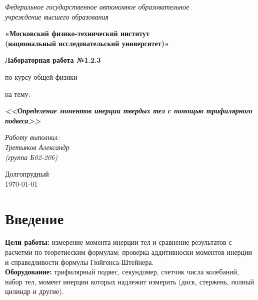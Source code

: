 




	
\begin{center}
	\textit{Федеральное государственное автономное образовательное\\ учреждение высшего образования }
	
	\vspace{0.5ex}
	
	\textbf{«Московский физико-технический институт\\ (национальный исследовательский университет)»}
\end{center}

\vspace{10ex}


\begin{center}
	\vspace{13ex}
	
	\textbf{Лабораторная работа №1.2.3}
	
	\vspace{1ex}
	
	по курсу общей физики
	
	на тему:
	
	\textbf{\textit{<<Определение моментов инерции твердых тел с помощью трифилярного подвеса>>}}
	
	\vspace{30ex}
	
	\begin{flushright}
		\noindent
		\textit{Работу выполнил:}\\  
		\textit{Третьяков Александр \\(группа Б02-206)}
	\end{flushright}
	\vfill
	Долгопрудный \\ \today
	
\end{center}
\newpage	


	\section{Введение}
	
	\textbf{Цели работы:} измерение момента инерции тел и сравнение результатов с расчетми по теоретиеским формулам; проверка аддитивноски моментов инерции и справедливости формулы Гюйгенса-Штейнера.\\
	\textbf{Оборудование:} трифилярный подвес, секундомер, счетчик числа колебаний, набор тел, момент инерции которых надлежит измерить (диск, стержень, полный цилиндр и другие).
	
